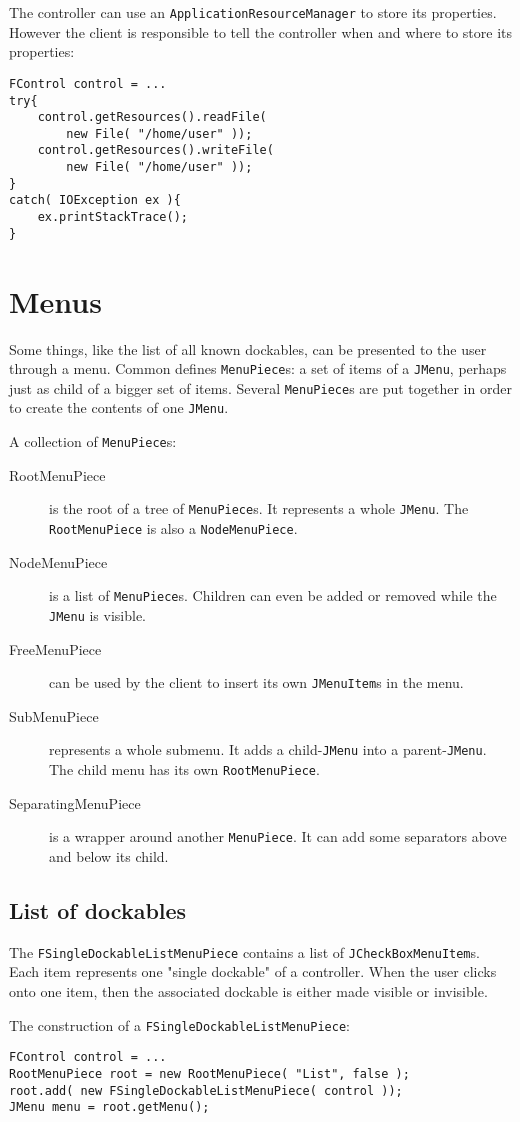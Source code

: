 \documentclass[a4paper,10pt]{article}
\newcommand{\src}[1]{\lstinline[basicstyle=\ttfamily]|#1|}
\begin{document}
The controller can use an \src{ApplicationResourceManager} to store its properties. However the client is responsible to tell the controller when and where to store its properties:
\begin{lstlisting}
FControl control = ...
try{
	control.getResources().readFile(
		new File( "/home/user" ));
	control.getResources().writeFile(
		new File( "/home/user" ));
}
catch( IOException ex ){
	ex.printStackTrace();
}
\end{lstlisting}

\section{Menus}
Some things, like the list of all known dockables, can be presented to the user through a menu. Common defines \src{MenuPiece}s: a set of items of a \src{JMenu}, perhaps just as child of a bigger set of items. Several \src{MenuPiece}s are put together in order to create the contents of one \src{JMenu}.

A collection of \src{MenuPiece}s:
\begin{description}
 \item[RootMenuPiece] is the root of a tree of \src{MenuPiece}s. It represents a whole \src{JMenu}. The \src{RootMenuPiece} is also a \src{NodeMenuPiece}.
 \item[NodeMenuPiece] is a list of \src{MenuPiece}s. Children can even be added or removed while the \src{JMenu} is visible.
 \item[FreeMenuPiece] can be used by the client to insert its own \src{JMenuItem}s in the menu.
 \item[SubMenuPiece] represents a whole submenu. It adds a child-\src{JMenu} into a parent-\src{JMenu}. The child menu has its own \src{RootMenuPiece}.
 \item[SeparatingMenuPiece] is a wrapper around another \src{MenuPiece}. It can add some separators above and below its child.
\end{description}

\subsection{List of dockables}
The \src{FSingleDockableListMenuPiece} contains a list of \src{JCheckBoxMenuItem}s. Each item represents one "single dockable" of a controller. When the user clicks onto one item, then the associated dockable is either made visible or invisible.

The construction of a \src{FSingleDockableListMenuPiece}:
\begin{lstlisting}
FControl control = ...
RootMenuPiece root = new RootMenuPiece( "List", false );
root.add( new FSingleDockableListMenuPiece( control ));
JMenu menu = root.getMenu();
\end{lstlisting}
\end{document}
